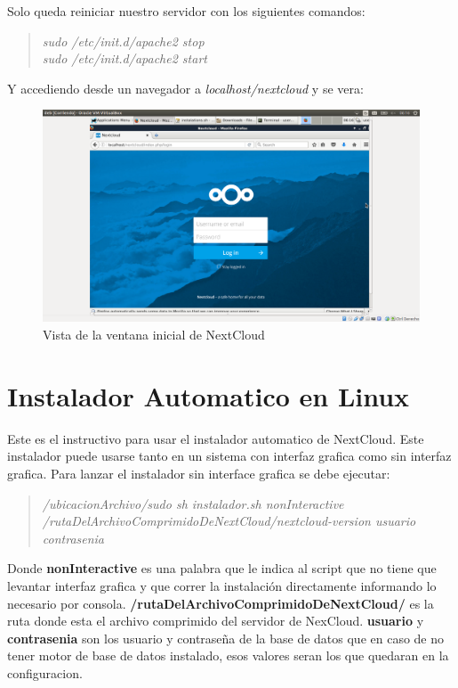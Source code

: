 \documentclass[11pt]{article}
\begin{document}
Solo queda reiniciar nuestro servidor con los siguientes comandos:
\begin{quote}
\emph{sudo /etc/init.d/apache2 stop\\
sudo /etc/init.d/apache2 start}
\end{quote}

Y accediendo desde un navegador a \emph{localhost/nextcloud} y se vera:
\begin{figure}[htp]
\centering
\includegraphics[scale=0.30]{nextcloud1.png}
\caption{Vista de la ventana inicial de NextCloud}
\label{}
\end{figure}

\clearpage


\section{Instalador Automatico en Linux}
Este es el instructivo para usar el instalador automatico de NextCloud.
Este instalador puede usarse tanto en un sistema con interfaz grafica como sin interfaz grafica.
Para lanzar el instalador sin interface grafica se debe ejecutar:

\begin{quote}
\emph{/ubicacionArchivo/sudo sh instalador.sh nonInteractive /rutaDelArchivoComprimidoDeNextCloud/nextcloud-version usuario contrasenia}
\end{quote}

Donde \textbf{nonInteractive} es una palabra que le indica al script que no tiene que levantar interfaz grafica y que correr la instalación directamente informando lo necesario por consola. \textbf{/rutaDelArchivoComprimidoDeNextCloud/} es la ruta donde esta el archivo comprimido del servidor de NexCloud. \textbf{usuario} y \textbf{contrasenia} son los usuario y contraseña de la base de datos que en caso de no tener motor de base de datos instalado, esos valores seran los que quedaran en la configuracion.
\end{document}
